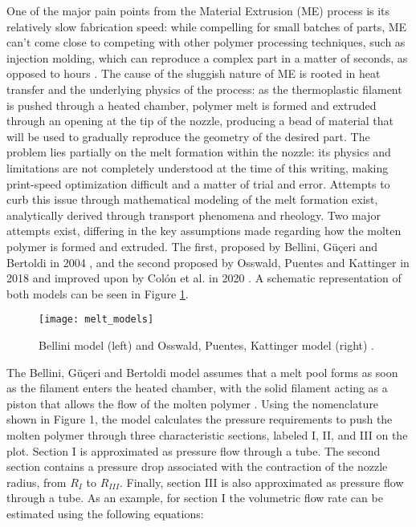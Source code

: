 \documentclass[main.tex]{subfiles}
\begin{document}
One of the major pain points from the Material Extrusion (ME) process is its relatively slow fabrication speed: while compelling for small batches of parts, ME can't come close to competing with other polymer processing techniques, such as injection molding, which can reproduce a complex part in a matter of seconds, as opposed to hours \cite{Baumers2016, Conner2014, Berman2012}. The cause of the sluggish nature of ME is rooted in heat transfer and the underlying physics of the process: as the thermoplastic filament is pushed through a heated chamber, polymer melt is formed and extruded through an opening at the tip of the nozzle, producing a bead of material that will be used to gradually reproduce the geometry of the desired part. The problem lies partially on the melt formation within the nozzle: its physics and limitations are not completely understood at the time of this writing, making print-speed optimization difficult and a matter of trial and error. Attempts to curb this issue through mathematical modeling of the melt formation exist, analytically derived through transport phenomena and rheology. Two major attempts exist, differing in the key assumptions made regarding how the molten polymer is formed and extruded. The first, proposed by Bellini, Güçeri and Bertoldi in 2004 \cite{Bellini2004}, and the second proposed by Osswald, Puentes and Kattinger in 2018 \cite{OsswaldMelting18} and improved upon by Colón et al. in 2020 \cite{ColonQuintana2020}. A schematic representation of both models can be seen in Figure \ref{fig:melt_model}.

\begin{figure}[!htbp]
	\center
	\texttt{[image: melt\_models]}
	\caption{Bellini model (left) and Osswald, Puentes, Kattinger model (right) \cite{Oehlmann2021}.} \label{fig:melt_model}
\end{figure}

The Bellini, Güçeri and Bertoldi model assumes that a melt pool forms as soon as the filament enters the heated chamber, with the solid filament acting as a piston that allows the flow of the molten polymer \cite{Bellini2004}. Using the nomenclature shown in Figure 1, the model calculates the pressure requirements to push the molten polymer through three characteristic sections, labeled I, II, and III on the plot. Section I is approximated as pressure flow through a tube. The second section contains a pressure drop associated with the contraction of the nozzle radius, from $R_I$ to $R_{III}$. Finally, section III is also approximated as pressure flow through a tube. As an example, for section I the volumetric flow rate can be estimated using the following equations:
\end{document}
